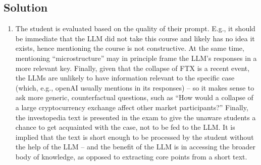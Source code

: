 \documentclass[a4paper]{article}
\begin{document}
\subsection*{Solution}
\begin{enumerate}
	\item The student is evaluated based on the quality of their prompt. E.g., it should be immediate that the LLM did not take this course and likely has no idea it exists, hence mentioning the course is not constructive. At the same time, mentioning ``microstructure'' may in principle frame the LLM's responses in a more relevant key. Finally, given that the collapse of FTX is a recent event, the LLMs are unlikely to have information relevant to the specific case (which, e.g., openAI usually mentions in its responses) -- so it makes sense to ask more generic, counterfactual questions, such as ``How would a collapse of a large cryptocurrency exchange affect other market participants?''
	Finally, the investopedia text is presented in the exam to give the unaware students a chance to get acquainted with the case, not to be fed to the LLM. It is implied that the text is short enough to be processed by the student without the help of the LLM -- and the benefit of the LLM is in accessing the broader body of knowledge, as opposed to extracting core points from a short text.
	

\end{enumerate}
\end{document}
